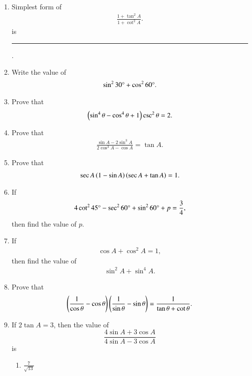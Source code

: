 \begin{enumerate}[label=\thesubsection.\arabic*,ref=\thesubsection.\theenumi,itemsep=1pt]
\item Simplest form of 
 \begin{align*}
     \frac{1 + \tan^{2}{A}}{1 + \cot^{2}{A}}
 .\end{align*}is \rule{1cm}{0.1pt}.
\hfill{}\item Write the value of
 \begin{align*}
	     \sin^{2}{30\degree} + \cos^{2}{60\degree}.
	\end{align*}
\hfill{}
\item Prove that  
        \begin{align*}
           \left(\sin^{4}{\theta} - \cos^{4}{\theta} + 1\right)\csc^{2}{\theta} = 2. 
        \end{align*}
\hfill{}
\item Prove that \begin{align*} \frac{\sin A-2 \sin^3A}{2\cos^3A-\cos A}=\tan A.\end{align*}
  \hfill{}\item Prove that \begin{align*} \sec A \left(1-\sin A\right)\left(\sec A+\tan A\right)=1.\end{align*}
%
\hfill{}\item If 
\begin{align*}
    4\cot^2 45\degree - \sec^2 60\degree + \sin^2 60\degree + p = \frac{3}{4}, 
\end{align*}
then find the value of $p$.
\hfill{}\item If 
\begin{align*}
    \cos A+ \cos^2A=1,
\end{align*}then find the value of 
\begin{align*}
\sin^2A+\sin^4A.
\end{align*}
\hfill{}\item Prove that
\begin{align*}
\left(\frac{1}{\cos\theta}-\cos\theta\right)\left(\frac{1}{\sin\theta}-\sin\theta\right) = \frac{1}{\tan\theta+\cot\theta}
.\end{align*}
%
\hfill{}\item If $2\tan A=3$, then the value of $$\frac{4\sin A + 3\cos A}{4\sin A - 3\cos A}$$ is
\begin{multicols}{4}
\begin{enumerate}
\item $\frac{7}{\sqrt{13}}$

\end{enumerate}
\end{multicols}
\end{enumerate}
